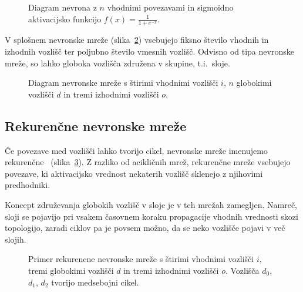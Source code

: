 \documentclass[a4paper,12pt,openright]{book}
\begin{document}
    \begin{figure}[H]
        \begin{center}
            
        \end{center}
        \caption{Diagram nevrona z $n$ vhodnimi povezavami in sigmoidno aktivacijsko funkcijo $f( x) =\frac{1}{1+e^{-x}}$.}
        \label{fig:diagram-nevrona}
    \end{figure}

    V splošnem nevronske mreže (slika~\ref{fig:diagram-mreze}) vsebujejo fiksno število vhodnih in izhodnih vozlišč ter poljubno število vmesnih vozlišč.
    Odvisno od tipa nevronske mreže, so lahko globoka vozlišča združena v skupine, t.i.\ sloje.

    \begin{figure}[H]
        \begin{center}
            
        \end{center}
        \caption{Diagram nevronske mreže s štirimi vhodnimi vozlišči $i$, $n$ globokimi vozlišči $d$ in tremi izhodnimi vozlišči $o$.}
        \label{fig:diagram-mreze}
    \end{figure}


    \subsection{Rekurenčne nevronske mreže}\label{subsec:rekurencne-nevronske-mreze}
    Če povezave med vozlišči lahko tvorijo cikel, nevronske mreže imenujemo rekurenčne~\cite{recurrent_neural_network_wiki} (slika~\ref{fig:diagram-rekurencne-mreze}).
    Z razliko od acikličnih mrež, rekurenčne mreže vsebujejo povezave, ki aktivacijsko vrednost nekaterih vozlišč
    sklenejo z njihovimi predhodniki.

    Koncept združevanja globokih vozlišč v sloje je v teh mrežah zamegljen.
    Namreč, sloji se pojavijo pri vsakem časovnem koraku propagacije vhodnih vrednosti skozi topologijo, zaradi ciklov pa je povsem možno,
    da se neko vozlišče pojavi v več slojih.
    \begin{figure}[H]
        \begin{center}
            
        \end{center}
        \caption{Primer rekurencne nevronske mreže s štirimi vhodnimi vozlišči $i$, tremi globokimi vozlišči $d$ in tremi izhodnimi vozlišči $o$.
        Vozlišča $d_0$, $d_1$, $d_2$ tvorijo medsebojni cikel.}
        \label{fig:diagram-rekurencne-mreze}
    \end{figure}
\end{document}
